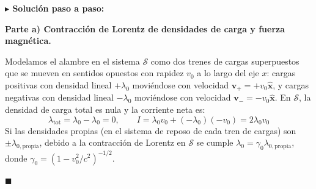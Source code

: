 \documentclass[11pt,a4paper]{book}
\newenvironment{solucion}{%
    \par\medskip\noindent\textbf{\color{blue!65!black}\Large $\blacktriangleright$ Solución paso a paso:}\par\medskip
}{%
    \hfill$\blacksquare$\par\bigskip
}
\newcommand{\xhat}{\hat{\bm{x}}}
\begin{document}
\begin{solucion}
\textbf{Parte a) Contracción de Lorentz de densidades de carga y fuerza magnética.}

Modelamos el alambre en el sistema $\mathcal{S}$ como dos trenes de cargas superpuestos que se mueven en sentidos opuestos con rapidez $v_0$ a lo largo del eje $x$: cargas positivas con densidad lineal $+\lambda_0$ moviéndose con velocidad $\bm{v}_+ = +v_0\xhat$, y cargas negativas con densidad lineal $-\lambda_0$ moviéndose con velocidad $\bm{v}_- = -v_0\xhat$.
En $\mathcal{S}$, la densidad de carga total es nula y la corriente neta es:
\begin{equation}
    \lambda_{\text{tot}} = \lambda_0 - \lambda_0 = 0, \qquad I = \lambda_0 v_0 + (-\lambda_0)(-v_0) = 2\lambda_0 v_0
\end{equation}
Si las densidades propias (en el sistema de reposo de cada tren de cargas) son $\pm\lambda_{0,\text{propia}}$, debido a la contracción de Lorentz en $\mathcal{S}$ se cumple $\lambda_0 = \gamma_0 \lambda_{0,\text{propia}}$, donde $\gamma_0 = (1 - v_0^2/c^2)^{-1/2}$.


\end{solucion}
\end{document}
